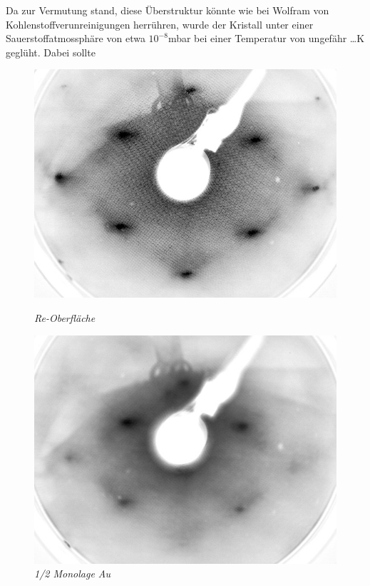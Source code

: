 Da zur Vermutung stand, diese Überstruktur könnte wie bei Wolfram von Kohlenstoffverunreinigungen
herrühren, wurde der Kristall unter einer Sauerstoffatmossphäre von etwa $10^{-8}$mbar bei einer
Temperatur von ungefähr \ldots K geglüht. Dabei sollte 

\begin{figure}[htbp]
		\captionsetup{name=Abb.}
	\begin{minipage}[b]{0.5\textwidth} 
		\includegraphics[width=\textwidth]{LEED-Bilder/bearbeitet/unbedampft_E207}
		\caption{\textit{Re-Oberfläche}}
		\label{0ML} 
	\end{minipage}
	\hfill
	\begin{minipage}[b]{0.5\textwidth}
		\includegraphics[width=\textwidth]{LEED-Bilder/bearbeitet/0_5ML_E208}
		\caption{\textit{1/2 Monolage Au}}
		\label{1/2ML} 
	\end{minipage}
	

\end{figure}
